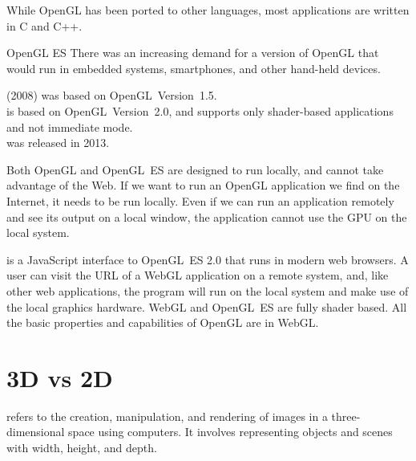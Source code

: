 \documentclass[../COS3712_Notes.tex]{subfiles}
\begin{document}
      While OpenGL has been ported to other languages,
      most applications are written in C and C++.

      \begin{definition}{OpenGL ES}
        There was an increasing demand for a version of OpenGL
        that would run in embedded systems, smartphones,
        and other hand-held devices.

         (2008) was based on OpenGL~Version~1.5.\\
         is based on OpenGL~Version~2.0,
        and supports only shader-based applications and not immediate mode.\\
         was released in 2013.
      \end{definition}

      Both OpenGL and OpenGL~ES are designed to run locally,
      and cannot take advantage of the Web.
      If we want to run an OpenGL application we find on the Internet,
      it needs to be run locally.
      Even if we can run an application remotely and see its output on a local window,
      the application cannot use the GPU on the local system.

       is a JavaScript interface to OpenGL~ES 2.0
      that runs in modern web browsers.
      A user can visit the URL of a WebGL application on a remote system,
      and, like other web applications,
      the program will run on the local system and make use of the local graphics hardware.
      WebGL and OpenGL~ES are fully shader based.
      All the basic properties and capabilities of OpenGL are in WebGL.

    \section{3D vs 2D}
       refers to the creation, manipulation, and rendering
      of images in a three-dimensional space using computers.
      It involves representing objects and scenes with width, height, and depth.
\end{document}
